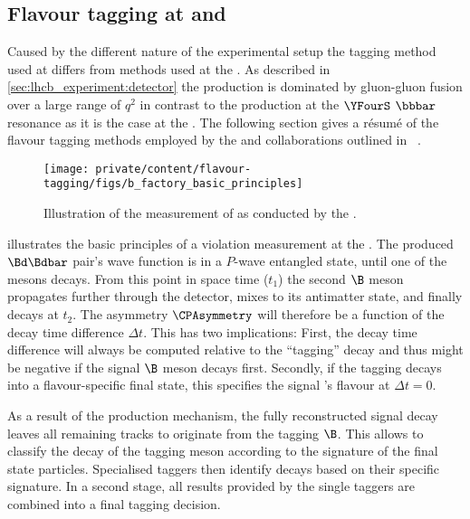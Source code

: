 \subsection*{Flavour tagging at \Babar and \Belle}
\label{sec:flavour_tagging:lhcb:b_factories}
Caused by the different nature of the experimental setup the tagging method used
at \LHCb differs from methods used at the \BFactories. As described in
\cref{sec:lhcb_experiment:detector} the \bhadron production is dominated
by gluon-gluon fusion over a large range of $q^2$ in contrast to the production
at the $\YFourS$ $\bbbar$ resonance as it is the case at the \BFactories. The
following section gives a résumé of the flavour tagging methods employed by the
\Babar and \Belle collaborations outlined in \Ref~\cite[][Ch. 8]{Bevan:2014iga}.
%
\begin{figure}
\centering
\texttt{[image: private/content/flavour-tagging/figs/b\_factory\_basic\_principles]}
\caption{Illustration of the measurement of \sintwobeta as conducted by the
\BFactories. \cite{Bevan:2014iga}}
\label{fig:flavour_tagging:lhcb:b_factory_basic_principles}
\end{figure}

 illustrates the basic
principles of a \CP violation measurement at the \BFactories. The produced
$\Bd\Bdbar$ pair's wave function is in a $P$-wave entangled state, until one of
the mesons decays. From this point in space time ($t_1$) the second $\B$ meson
propagates further through the detector, mixes to its antimatter state, and
finally decays at $t_2$. The \CP asymmetry $\CPAsymmetry$ will therefore be a
function of the decay time difference $\Delta t$. This has two implications:
First, the decay time difference will always be computed relative to the
\enquote{tagging} \Bmeson decay and thus might be negative if the signal $\B$
meson decays first. Secondly, if the tagging \Bmeson decays into a
flavour-specific final state, this specifies the signal \Bmeson's flavour at
$\Delta t=0$.

As a result of the production mechanism, the fully reconstructed signal decay
leaves all remaining tracks to originate from the tagging $\B$. This allows to
classify the decay of the tagging meson according to the signature of the final
state particles. Specialised taggers then identify decays based on their
specific signature. In a second stage, all results provided by the single
taggers are combined into a final tagging decision. 

